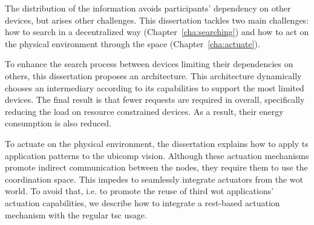 The distribution of the information avoids participants' dependency on other devices, but arises other challenges.
This dissertation tackles two main challenges: how to search in a decentralized way (Chapter~\ref{cha:searching}) and how to act on the physical environment through the space (Chapter~\ref{cha:actuate}).


To enhance the search process between devices limiting their dependencies on others, this dissertation proposes an architecture.
This architecture dynamically chooses an intermediary according to its capabilities to support the most limited devices.
The final result is that fewer requests are required in overall, specifically reducing the load on resource constrained devices.
As a result, their energy consumption is also reduced.


To actuate on the physical environment, the dissertation explains how to apply \ac{ts} application patterns to the \ac{ubicomp} vision.
Although these actuation mechanisms promote indirect communication between the nodes, they require them to use the coordination space.
This impedes to seamlessly integrate actuators from the \ac{wot} world. %
To avoid that, i.e. to promote the reuse of third \ac{wot} applications' actuation capabilities, we describe how to integrate a \ac{rest}-based actuation mechanism with the regular \ac{tsc} usage.








